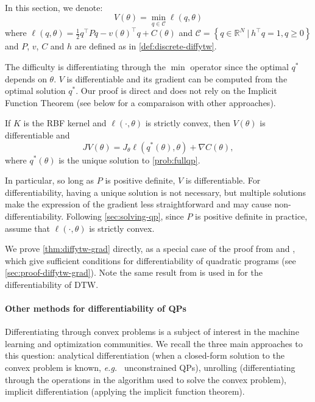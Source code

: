 \paragraph{}
In this section, we denote:
\begin{equation}\label{prob:fullqp}
    V(\theta) = \min_{q\in\mathcal C} \ell(q, \theta)
\end{equation}
where $\ell(q, \theta) = \frac{1}{2} q^\top Pq - v(\theta)^\top q + C(\theta)$ and $\mathcal C = \left\lbrace q\in\mathbb R^N ~\vert~ h^\top q=1, q \geq 0\right\rbrace$ and $P$, $v$, $C$ and $h$ are defined as in \cref{def:discrete-diffytw}.

The difficulty is differentiating through the $\min$ operator since the optimal $q^*$ depends on $\theta$. $V$ is differentiable and its gradient can be computed from the optimal solution $q^*$. Our proof is direct and does not rely on the Implicit Function Theorem (see below for a comparaison with other approaches).

\begin{theorem}\label{thm:diffytw-grad}
    If $K$ is the RBF kernel and $\ell(\cdot, \theta)$ is strictly convex, then $V(\theta)$ is differentiable and
    \begin{equation}
         JV(\theta) = J_\theta \ell(q^*(\theta), \theta) + \nabla C(\theta),
    \end{equation} where $q^*(\theta)$ is the unique solution to \cref{prob:fullqp}.
\end{theorem}

In particular, so long as $P$ is positive definite, $V$ is differentiable. For differentiability, having a unique solution is not necessary, but multiple solutions make the expression of the gradient less straightforward and may cause non-differentiability. Following \cref{sec:solving-qp}, since $P$ is positive definite in practice, assume that $\ell(\cdot, \theta)$ is strictly convex.

We prove \cref{thm:diffytw-grad} directly, as a special case of the proof from \cite{shapiro} and \cite{lee}, which give sufficient conditions for differentiability of quadratic programs (see \cref{sec:proof-diffytw-grad}). Note the same result from \citep{shapiro} is used in \cite{tavenard-dtw-diff} for the differentiability of DTW.

\paragraph{Other methods for differentiability of QPs}
Differentiating through convex problems is a subject of interest in the machine learning and optimization communities. We recall the three main approaches to this question: analytical differentiation (when a closed-form solution to the convex problem is known, \emph{e.g.\ } unconstrained QPs), unrolling (differentiating through the operations in the algorithm used to solve the convex problem), implicit differentiation (applying the implicit function theorem).

